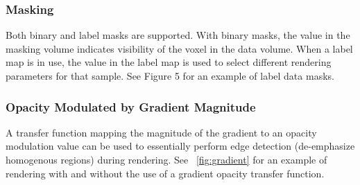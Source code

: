 \subsubsection{Masking}
Both binary and label masks are supported. With binary masks, the value in the masking volume indicates visibility of the voxel in the data volume. When a label map is in use, the value in the label map is used to select different rendering parameters for that sample.  See Figure 5 for an example of label data masks.

\subsubsection{Opacity Modulated by Gradient Magnitude}
A transfer function mapping the magnitude of the gradient to an opacity modulation value can be used to essentially perform edge detection (de-emphasize homogenous regions) during rendering. See ~\ref{fig:gradient} for an example of rendering with and without the use of a gradient opacity transfer function.

